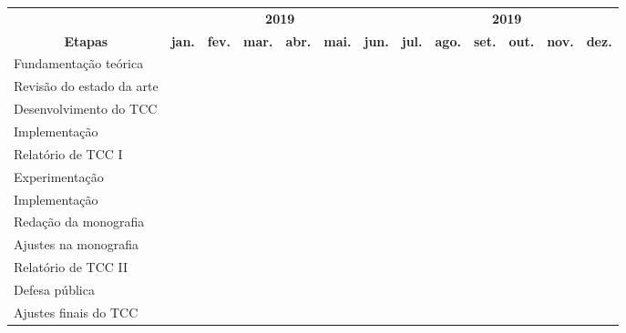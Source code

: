 \documentclass[11pt]{letter}
\begin{document}
\begin{center}
	\begin{tabular}{|p{4.04cm}|*{12}{c|}}
		\hline & \multicolumn{6}{c|}{\textbf{2019}}
			& \multicolumn{6}{c|}{\textbf{2019}} \\ \cline{2-13}
		\multicolumn{1}{|c|}{\multirow{-2}{*}{\textbf{Etapas}}}
			& \textbf{jan.} & \textbf{fev.} & \textbf{mar.}
			& \textbf{abr.} & \textbf{mai.} & \textbf{jun.}
			& \textbf{jul.} & \textbf{ago.} & \textbf{set.}
			& \textbf{out.} & \textbf{nov.} & \textbf{dez.} \\
		\hline Fundamentação teórica
			& \cellcolor{lightgray} & & & & & & & & & & & \\
		\hline Revisão do estado da arte
			& \cellcolor{lightgray} & \cellcolor{lightgray}
			& \cellcolor{lightgray} & & & & & & & & & \\
			\hline Desenvolvimento do TCC
			& & & \cellcolor{lightgray} & \cellcolor{lightgray}
			& \cellcolor{lightgray} & & & & & & & \\
		\hline Implementação
			& & & & & \cellcolor{lightgray} & \cellcolor{lightgray}
			& & & & & & \\
		\hline Relatório de TCC I
			& & & & & \cellcolor{lightgray} & & & & & & & \\
		\hline Experimentação
			& & & & & & & \cellcolor{lightgray} & & & & & \\
		\hline Implementação
			& & & & & & & & \cellcolor{lightgray} & & & & \\
		\hline Redação da monografia
			& & & & & & & & \cellcolor{lightgray} & \cellcolor{lightgray}
			& \cellcolor{lightgray} & & \\
		\hline Ajustes na monografia
			& & & & & & & & & & \cellcolor{lightgray} & & \\
		\hline Relatório de TCC II
			& & & & & & & & & & & \cellcolor{lightgray} & \\
		\hline Defesa pública
			& & & & & & & & & & & & \cellcolor{lightgray} \\
		\hline Ajustes finais do TCC
			& & & & & & & & & & & & \cellcolor{lightgray} \\
		\hline
	\end{tabular}

	\vspace*{\fill}
\end{center}
\end{document}
